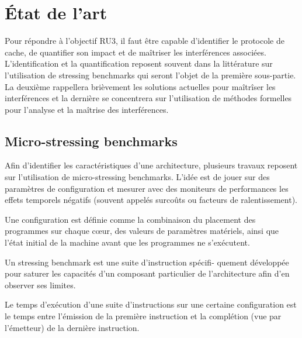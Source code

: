 \section{\'Etat de l'art}
\label{fr:sec:rel_works}
Pour répondre à l'objectif RU3, il faut être capable d'identifier le protocole de cache, de quantifier son impact
et de maîtriser les interférences associées.
L'identification et la quantification reposent souvent dans la littérature sur l'utilisation de stressing benchmarks qui seront l'objet de la première sous-partie.
La deuxième rappellera brièvement les solutions actuelles pour maîtrîser les interférences et la dernière se concentrera sur l'utilisation de méthodes formelles pour l'analyse
et la maîtrise des interférences.
\subsection{Micro-stressing benchmarks}
\label{fr:sec:benchs}
Afin d'identifier les caractéristiques d'une architecture, plusieurs travaux
reposent sur l'utilisation de micro-stressing benchmarks.
L'idée est de jouer sur des paramètres de configuration et
mesurer avec des moniteurs de performances les effets temporels négatifs (souvent appelés surcoûts ou facteurs de ralentissement). 
\begin{definition}[Configuration]
\label{fr:def:configuration}
Une configuration est définie comme la combinaison du placement des
programmes sur chaque cœur, des valeurs de paramètres matériels, ainsi que
l'état initial de la machine avant que les programmes ne s'exécutent.
\end{definition}

\begin{definition}
Un stressing benchmark est une suite d'instruction spécifi- quement développée pour saturer les capacités
d'un composant particulier de l'architecture afin d'en observer ses limites.
\end{definition}

\begin{definition}
Le temps d'exécution d'une suite d'instructions sur une certaine configuration
est le temps entre l'émission de la première instruction et la complétion (vue
par l'émetteur) de la dernière instruction.
\end{definition}


